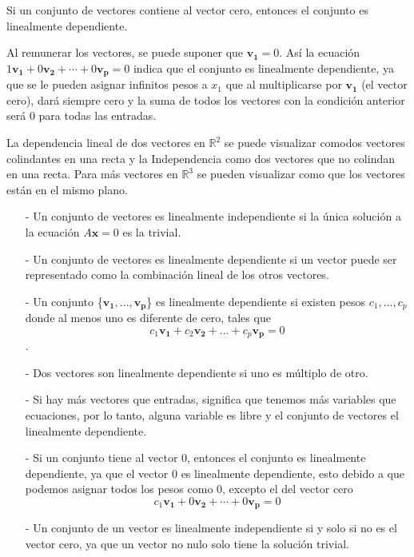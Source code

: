 \documentclass{article}
\begin{document}
\begin{tcolorbox}[colback=red!10!white, colframe=red!70!black, title=Caso especial 2]
    Si un conjunto de vectores contiene al vector cero, entonces el conjunto es linealmente dependiente.
\end{tcolorbox}

Al remunerar los vectores, se puede suponer que $\mathbf{v_1} = 0$. Así la ecuación $1\mathbf{v_1} + 0\mathbf{v_2} + \dotsb + 0\mathbf{v_p} = 0$ indica que el conjunto es linealmente dependiente, ya que se le pueden asignar infinitos pesos a $x_1$ que al multiplicarse por $\mathbf{v_1}$ (el vector cero), dará siempre cero y la suma de todos los vectores con la condición anterior será 0 para todas las entradas. \cite{DavidC}

\begin{tcolorbox}[colback=red!10!white, colframe=red!70!black, title=Resumen]
    La dependencia lineal de dos vectores en $\mathbb{R}^2$ se puede visualizar comodos vectores colindantes en una recta y la Independencia como dos vectores que no colindan en una recta. Para más vectores en $\mathbb{R}^3$ se pueden visualizar como que los vectores están en el mismo plano.
    \begin{itemize}
        \item[-] Un conjunto de vectores es linealmente independiente si la única solución a la ecuación $A \mathbf{x} = 0$ es la trivial.
        \item[-] Un conjunto de vectores es linealmente dependiente si un vector puede ser representado como la combinación lineal de los otros vectores.
        \item[-]  Un conjunto \{$\mathbf{v_1},..., \mathbf{v_p}$\} es linealmente dependiente si existen pesos $c_1, ..., c_p$ donde al menos uno es diferente de cero, tales que $$c_1\mathbf{v_1} + c_2\mathbf{v_2} + ... + c_p\mathbf{v_p} = 0$$.
        \item[-] Dos vectores son linealmente dependiente si uno es múltiplo de otro. 
        \item[-] Si hay más vectores que entradas, significa que tenemos más variables que ecuaciones, por lo tanto, alguna variable es libre y el conjunto de vectores el linealmente dependiente. 
        \item[-] Si un conjunto tiene al vector 0, entonces el conjunto es linealmente dependiente, ya que el vector 0 es linealmente dependiente, esto debido a que podemos asignar todos los pesos como 0, excepto el del vector cero $$c_1\mathbf{v_1} + 0\mathbf{v_2} + \dotsb + 0\mathbf{v_p} = 0$$
        \item[-] Un conjunto de un vector es linealmente independiente si y solo si no es el vector cero, ya que un vector no nulo solo tiene la solución trivial.  
    \end{itemize}
\end{tcolorbox}


\end{document}
